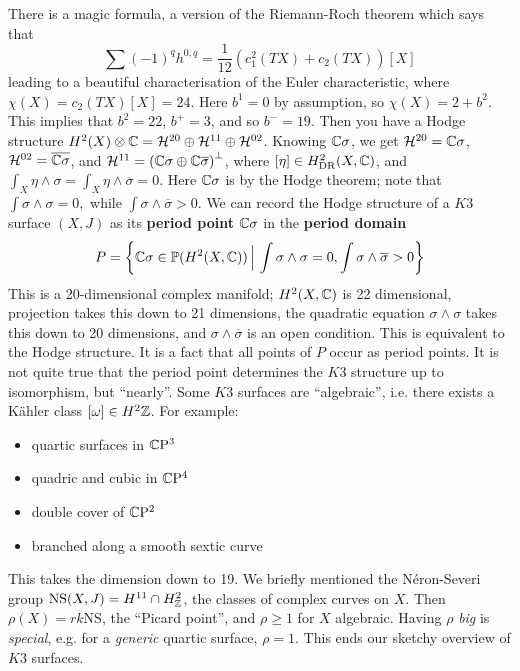 There is a magic formula, a version of the Riemann-Roch theorem which says that \[
    \sum (-1)^q h ^{0,q}= \frac{1}{12}\left( c_1^2 (TX)+ c_2(TX) \right) [X]
\] leading to a beautiful characterisation of the Euler characteristic, where $\chi(X) = c_2(TX)[X] = 24$. Here $b^1=0$ by assumption, so $\chi(X) = 2+ b^2$. This implies that $b^2 = 22$, $b^+ = 3$, and so $b^-= 19$. Then you have a Hodge structure $H^2(X) \otimes \mathbb{C} = \mathcal H ^{20}\oplus \mathcal H ^{11}\oplus \mathcal H ^{02}$. Knowing $\mathbb{C} \sigma$, we get $\mathcal H ^{20}= \mathbb{C} \sigma$, $\mathcal H ^{02}=\overline{\mathbb{C} \sigma}$, and $\mathcal H ^{11}= \left( \mathbb{C} \sigma \oplus \mathbb{C} \overline{\sigma} \right) ^{\perp}$, where $[\eta] \in H^2 _{\mathrm{DR}}(X,\mathbb{C})$, and $\int_X\eta \wedge \sigma =\int_X \eta \wedge \overline{\sigma}=0$. Here $\mathbb{C}\sigma$ is by the Hodge theorem; note that $\int \sigma \wedge \sigma = 0,$ while $\int \sigma \wedge \overline{\sigma}>0$. 
We can record the Hodge structure of a $K 3$ surface $(X,J)$ as its \textbf{period point} $\mathbb{C} \sigma$ in the \textbf{period domain} \[
    P = \left\{ \mathbb{C} \sigma \in \mathbb P (H^2(X,\mathbb{C}) )\,\Big|\,  \int \sigma \wedge \sigma = 0, \int \sigma \wedge \overline{\sigma}>0 \right\} 
\] This is a 20-dimensional complex manifold; $H^2(X,\mathbb{C})$ is 22 dimensional, projection takes this down to 21 dimensions, the quadratic equation $\sigma \wedge \sigma$ takes this down to 20 dimensions, and $\sigma \wedge \overline{\sigma}$ is an open condition. This is equivalent to the Hodge structure. It is a fact that all points of $P$ occur as period points. It is not quite true that the period point determines the $K 3$ structure up to isomorphism, but ``nearly''.
Some $K 3$ surfaces are ``algebraic'', i.e. there exists a K\"ahler class $[\omega] \in H^2\mathbb{Z}$. For example:
\begin{itemize}
\setlength\itemsep{-.2em}
    \item quartic surfaces in $\mathbb{C} \mathrm{P^3}$
    \item quadric and cubic in $\mathbb{C} \mathrm{P^4}$
    \item double cover of $\mathbb{C} \mathrm{P^2}$
    \item  branched along a smooth sextic curve
\end{itemize}
This takes the dimension down to 19. We briefly mentioned the N\'eron-Severi group $\mathrm{NS}(X,J) = H ^{11}\cap H^2_{\mathbb{Z}}$, the classes of complex curves on $X$. Then $\rho(X) = rk \mathrm{NS}$, the ``Picard point'', and $\rho \geq 1$ for $X$ algebraic. Having $\rho$ \emph{big} is \emph{special}, e.g. for a \emph{generic} quartic surface, $\rho = 1$. This ends our sketchy overview of $K 3$ surfaces.

